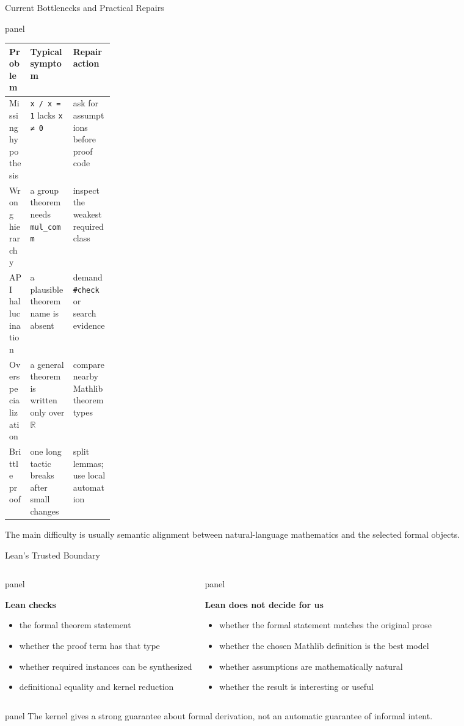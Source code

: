 \documentclass[aspectratio=169,10pt]{beamer}
\newcommand{\term}[1]{\textcolor{DOneBlue}{\textbf{#1}}}
\newenvironment{dpanel}{%
  \begin{beamercolorbox}[wd=\dimexpr\linewidth-9pt\relax,leftskip=0.15cm,rightskip=0.15cm plus1fil,rounded=true]{panel}%
  \setlength{\linewidth}{\hsize}%
  \vspace{0.10cm}%
}{\vspace{0.10cm}\end{beamercolorbox}}
\begin{document}
\begin{frame}{Current Bottlenecks and Practical Repairs}
\begin{dpanel}
\begin{tabularx}{\linewidth}{@{}p{0.20\linewidth} Y Y@{}}
\toprule
\term{Problem} & \term{Typical symptom} & \term{Repair action} \\
\midrule
Missing hypothesis & \texttt{x / x = 1} lacks \texttt{x ≠ 0} & ask for assumptions before proof code \\
Wrong hierarchy & a group theorem needs \texttt{mul\_comm} & inspect the weakest required class \\
API hallucination & a plausible theorem name is absent & demand \texttt{\#check} or search evidence \\
Overspecialization & a general theorem is written only over \(\mathbb{R}\) & compare nearby Mathlib theorem types \\
Brittle proof & one long tactic breaks after small changes & split lemmas; use local automation \\
\bottomrule
\end{tabularx}
\end{dpanel}
\vspace{0.25cm}
The main difficulty is usually semantic alignment between natural-language mathematics and the selected formal objects.
\end{frame}

\begin{frame}{Lean’s Trusted Boundary}
\begin{columns}[T,onlytextwidth]
\begin{dpanel}
\term{Lean checks}
\begin{itemize}
  \item the formal theorem statement
  \item whether the proof term has that type
  \item whether required instances can be synthesized
  \item definitional equality and kernel reduction
\end{itemize}
\end{dpanel}
\begin{dpanel}
\term{Lean does not decide for us}
\begin{itemize}
  \item whether the formal statement matches the original prose
  \item whether the chosen Mathlib definition is the best model
  \item whether assumptions are mathematically natural
  \item whether the result is interesting or useful
\end{itemize}
\end{dpanel}
\end{columns}
\vspace{0.38cm}
\begin{dpanel}\centering
The kernel gives a strong guarantee about formal derivation, not an automatic guarantee of informal intent.
\end{dpanel}
\end{frame}
\end{document}

